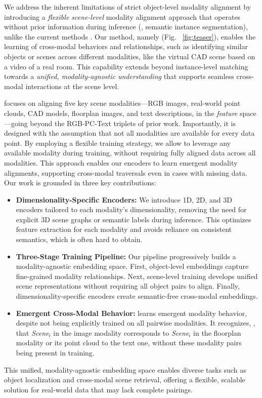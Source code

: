 We address the inherent limitations of strict object-level modality alignment by introducing a \textit{flexible scene-level} modality alignment approach that operates without prior information during inference (\eg, semantic instance segmentation), unlike the current methods \cite{sarkar2023sgaligner,xie2024sg}. Our method, namely \textbf{\textit{\project{}}} (Fig. ~\ref{fig:teaser}), enables the learning of cross-modal behaviors and relationships, such as identifying similar objects or scenes across different modalities, like the virtual CAD scene based on a video of a real room. This capability extends beyond instance-level matching towards a \textit{unified, modality-agnostic understanding} that supports seamless cross-modal interactions at the scene level.

\textit{\project{}} focuses on aligning five key scene modalities---RGB images, real-world point clouds, CAD models, floorplan images, and text descriptions, in the \textit{feature} space---going beyond the RGB-PC-Text triplets of prior work. Importantly, it is designed with the assumption that not all modalities are available for every data point. By employing a flexible training strategy, we allow \project{} to leverage any available modality during training, without requiring fully aligned data across all modalities. This approach enables our encoders to learn emergent modality alignments, supporting cross-modal traversals even in cases with missing data. Our work is grounded in three key contributions:
\begin{itemize}
\item \textbf{Dimensionality-Specific Encoders:} We introduce 1D, 2D, and 3D encoders tailored to each modality's dimensionality, removing the need for explicit 3D scene graphs or semantic labels during inference. This optimizes feature extraction for each modality and avoids reliance on consistent semantics, which is often hard to obtain.
\item \textbf{Three-Stage Training Pipeline:} Our pipeline progressively builds a modality-agnostic embedding space. First, object-level embeddings capture fine-grained modality relationships. Next, scene-level training develops unified scene representations without requiring all object pairs to align. Finally, dimensionality-specific encoders create semantic-free cross-modal embeddings.
\item \textbf{Emergent Cross-Modal Behavior:} \project{} learns emergent modality behavior, despite not being explicitly trained on all pairwise modalities. It recognizes, \eg, that \textit{Scene$_i$} in the image modality corresponds to \textit{Scene$_i$} in the floorplan modality or its point cloud to the text one, without these modality pairs being present in training.
\end{itemize}

This unified, modality-agnostic embedding space enables diverse tasks such as object localization and cross-modal scene retrieval, offering a flexible, scalable solution for real-world data that may lack complete pairings.
